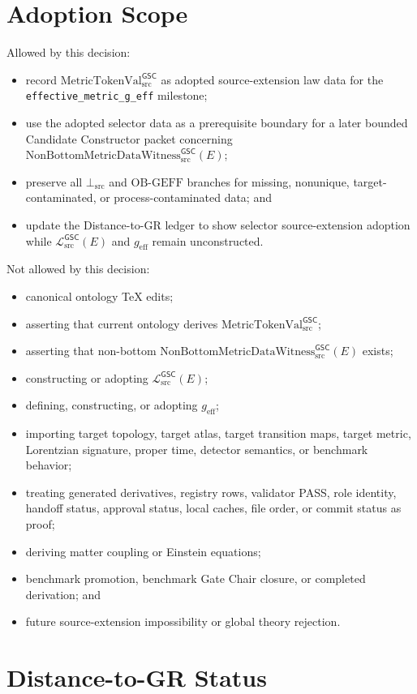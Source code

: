 \documentclass[11pt]{article}
\newcommand{\MetricTokenVal}{\mathrm{MetricTokenVal}_{\mathrm{src}}^{\mathsf{GSC}}}
\newcommand{\MetricData}{\mathcal{L}_{\mathrm{src}}^{\mathsf{GSC}}}
\newcommand{\Witness}{\mathrm{NonBottomMetricDataWitness}_{\mathrm{src}}^{\mathsf{GSC}}}
\newcommand{\BottomSrc}{\bot_{\mathrm{src}}}
\newcommand{\OBGEFF}{\mathrm{OB\mbox{-}GEFF}}
\newcommand{\geff}{g_{\mathrm{eff}}}
\begin{document}
\section{Adoption Scope}

Allowed by this decision:
\begin{itemize}[leftmargin=*]
  \item record \(\MetricTokenVal\) as adopted source-extension law data for
  the \texttt{effective\_metric\_g\_eff} milestone;
  \item use the adopted selector data as a prerequisite boundary for a later
  bounded Candidate Constructor packet concerning \(\Witness(E)\);
  \item preserve all \(\BottomSrc\) and \(\OBGEFF\) branches for missing,
  nonunique, target-contaminated, or process-contaminated data; and
  \item update the Distance-to-GR ledger to show selector source-extension
  adoption while \(\MetricData(E)\) and \(\geff\) remain unconstructed.
\end{itemize}

Not allowed by this decision:
\begin{itemize}[leftmargin=*]
  \item canonical ontology TeX edits;
  \item asserting that current ontology derives \(\MetricTokenVal\);
  \item asserting that non-bottom \(\Witness(E)\) exists;
  \item constructing or adopting \(\MetricData(E)\);
  \item defining, constructing, or adopting \(\geff\);
  \item importing target topology, target atlas, target transition maps,
  target metric, Lorentzian signature, proper time, detector semantics, or
  benchmark behavior;
  \item treating generated derivatives, registry rows, validator PASS, role
  identity, handoff status, approval status, local caches, file order, or
  commit status as proof;
  \item deriving matter coupling or Einstein equations;
  \item benchmark promotion, benchmark Gate Chair closure, or completed
  derivation; and
  \item future source-extension impossibility or global theory rejection.
\end{itemize}

\section{Distance-to-GR Status}
\end{document}
